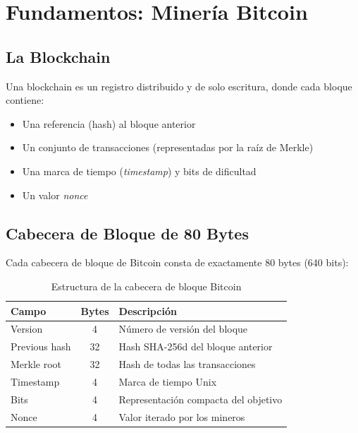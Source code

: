 \documentclass[12pt,a4paper]{article}
\begin{document}
\section{Fundamentos: Miner\'ia Bitcoin}

\subsection{La Blockchain}

Una blockchain es un registro distribuido y de solo escritura, donde cada bloque
contiene:
\begin{itemize}[leftmargin=2em]
    \item Una referencia (hash) al bloque anterior
    \item Un conjunto de transacciones (representadas por la ra\'iz de Merkle)
    \item Una marca de tiempo (\textit{timestamp}) y bits de dificultad
    \item Un valor \textit{nonce}
\end{itemize}

\subsection{Cabecera de Bloque de 80 Bytes}

Cada cabecera de bloque de Bitcoin consta de exactamente 80 bytes (640 bits):

\begin{table}[h]
    \centering
    \caption{Estructura de la cabecera de bloque Bitcoin}
    \begin{tabular}{@{}lcl@{}}
        \toprule
        \textbf{Campo} & \textbf{Bytes} & \textbf{Descripci\'on} \\
        \midrule
        Version           & 4  & N\'umero de versi\'on del bloque \\
        Previous hash     & 32 & Hash SHA-256d del bloque anterior \\
        Merkle root       & 32 & Hash de todas las transacciones \\
        Timestamp         & 4  & Marca de tiempo Unix \\
        Bits              & 4  & Representaci\'on compacta del objetivo \\
        Nonce             & 4  & Valor iterado por los mineros \\
        \bottomrule
    \end{tabular}
\end{table}
\end{document}
